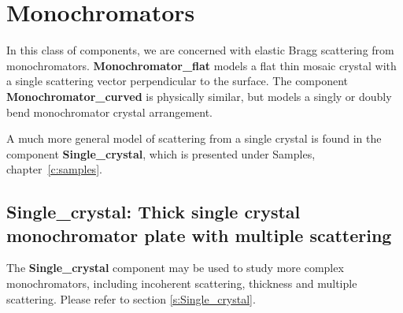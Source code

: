 
\chapter{Monochromators}

In this class of components, we are concerned with elastic Bragg
scattering from monochromators. {\bf Monochromator\_flat}
models a flat thin mosaic crystal with a single scattering vector
perpendicular to the surface.
The component {\bf Monochromator\_curved} is physically similar,
but models a singly or doubly bend monochromator crystal arrangement.

A much more general model of scattering from a single crystal is
found in the component {\bf Single\_crystal},
which is presented under Samples, chapter~\ref{c:samples}.





\section{Single\_crystal: Thick single crystal monochromator plate with multiple scattering}

The {\bf Single\_crystal} component may be used to study more complex monochromators, including incoherent scattering, thickness and multiple scattering. Please refer to section \ref{s:Single_crystal}.
